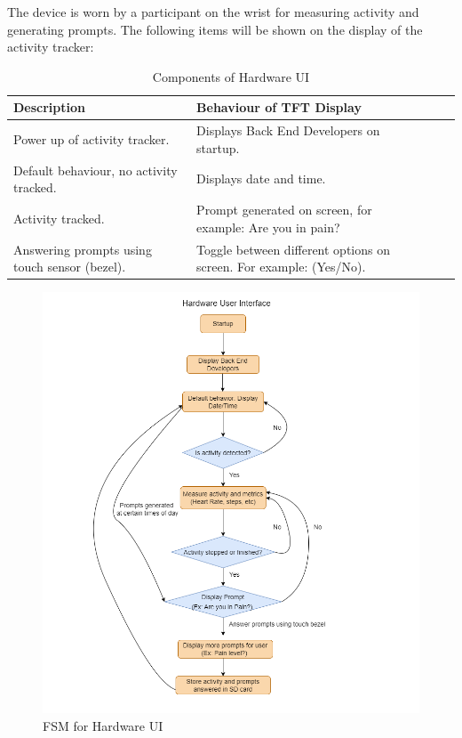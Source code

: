 \documentclass[12pt, titlepage]{article}
\begin{document}
The device is worn by a participant on the wrist for measuring activity and generating  prompts. The following items will be shown on the display of the activity tracker:
\begin{table}[H]
	\begin{tabularx}{1.05\textwidth} { 
		  | >{\centering\arraybackslash}X 
		  | >{\centering\arraybackslash}X 
		  | >{\centering\arraybackslash}X 
		  | >{\centering\arraybackslash}X | }
		 \hline
		 \textbf{Description} & \textbf{Behaviour of TFT Display} \\
		 \hline
		Power up of activity tracker. & Displays Back End Developers on startup.\\
		\hline
		 Default behaviour, no activity tracked.  & Displays date and time.\\
		 \hline
		   Activity tracked. & Prompt generated on screen, for example: Are you in pain?\\
		\hline 
		Answering prompts using touch sensor (bezel). & Toggle between different 				options on screen. For example: (Yes/No).\\
		\hline
	\end{tabularx}
\caption{\label{Hardware User Interface}Components of Hardware UI}  
\end{table}

\begin{figure}[H]
	\begin{center}
		 \includegraphics[width=1\textwidth]{HardwareUI_FSM}
		\caption{FSM for Hardware UI}
		\label{HardwareUI_FSM} 
	\end{center}
\end{figure}
\end{document}
